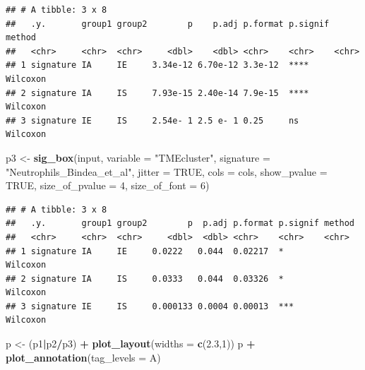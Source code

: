 \documentclass[
  12pt,
]{book}
\newenvironment{Shaded}{\begin{snugshade}}{\end{snugshade}}
\newcommand{\AttributeTok}[1]{\textcolor[rgb]{0.13,0.29,0.53}{#1}}
\newcommand{\ConstantTok}[1]{\textcolor[rgb]{0.56,0.35,0.01}{#1}}
\newcommand{\DecValTok}[1]{\textcolor[rgb]{0.00,0.00,0.81}{#1}}
\newcommand{\FloatTok}[1]{\textcolor[rgb]{0.00,0.00,0.81}{#1}}
\newcommand{\FunctionTok}[1]{\textcolor[rgb]{0.13,0.29,0.53}{\textbf{#1}}}
\newcommand{\NormalTok}[1]{#1}
\newcommand{\OtherTok}[1]{\textcolor[rgb]{0.56,0.35,0.01}{#1}}
\newcommand{\SpecialCharTok}[1]{\textcolor[rgb]{0.81,0.36,0.00}{\textbf{#1}}}
\newcommand{\StringTok}[1]{\textcolor[rgb]{0.31,0.60,0.02}{#1}}
\theoremstyle{definition}
\theoremstyle{definition}
\theoremstyle{definition}
\theoremstyle{definition}
\theoremstyle{remark}
\begin{document}
\begin{verbatim}
## # A tibble: 3 x 8
##   .y.       group1 group2        p    p.adj p.format p.signif method  
##   <chr>     <chr>  <chr>     <dbl>    <dbl> <chr>    <chr>    <chr>   
## 1 signature IA     IE     3.34e-12 6.70e-12 3.3e-12  ****     Wilcoxon
## 2 signature IA     IS     7.93e-15 2.40e-14 7.9e-15  ****     Wilcoxon
## 3 signature IE     IS     2.54e- 1 2.5 e- 1 0.25     ns       Wilcoxon
\end{verbatim}

\begin{Shaded}
\begin{Highlighting}[]
\NormalTok{p3 }\OtherTok{\textless{}{-}} \FunctionTok{sig\_box}\NormalTok{(input, }\AttributeTok{variable =} \StringTok{"TMEcluster"}\NormalTok{, }\AttributeTok{signature =} \StringTok{"Neutrophils\_Bindea\_et\_al"}\NormalTok{,  }
              \AttributeTok{jitter =} \ConstantTok{TRUE}\NormalTok{, }\AttributeTok{cols =}\NormalTok{  cols, }\AttributeTok{show\_pvalue =} \ConstantTok{TRUE}\NormalTok{, }\AttributeTok{size\_of\_pvalue =} \DecValTok{4}\NormalTok{, }\AttributeTok{size\_of\_font =} \DecValTok{6}\NormalTok{)}
\end{Highlighting}
\end{Shaded}

\begin{verbatim}
## # A tibble: 3 x 8
##   .y.       group1 group2        p  p.adj p.format p.signif method  
##   <chr>     <chr>  <chr>     <dbl>  <dbl> <chr>    <chr>    <chr>   
## 1 signature IA     IE     0.0222   0.044  0.02217  *        Wilcoxon
## 2 signature IA     IS     0.0333   0.044  0.03326  *        Wilcoxon
## 3 signature IE     IS     0.000133 0.0004 0.00013  ***      Wilcoxon
\end{verbatim}

\begin{Shaded}
\begin{Highlighting}[]
\NormalTok{p }\OtherTok{\textless{}{-}}\NormalTok{ (p1}\SpecialCharTok{|}\NormalTok{p2}\SpecialCharTok{/}\NormalTok{p3) }\SpecialCharTok{+} \FunctionTok{plot\_layout}\NormalTok{(}\AttributeTok{widths =} \FunctionTok{c}\NormalTok{(}\FloatTok{2.3}\NormalTok{,}\DecValTok{1}\NormalTok{))}
\NormalTok{p }\SpecialCharTok{+} \FunctionTok{plot\_annotation}\NormalTok{(}\AttributeTok{tag\_levels =} \StringTok{\textquotesingle{}A\textquotesingle{}}\NormalTok{)}
\end{Highlighting}
\end{Shaded}
\end{document}
